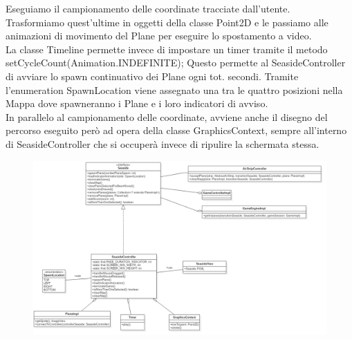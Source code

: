 \documentclass[a4paper,12pt]{report}
\begin{document}
\noindent Eseguiamo il campionamento delle coordinate tracciate dall’utente.
\\
Trasformiamo quest’ultime in oggetti della classe Point2D e le passiamo alle animazioni di movimento del Plane per eseguire lo spostamento a 
video.
\\
La classe Timeline permette invece di impostare un timer tramite il metodo setCycleCount(Animation.INDEFINITE);
Questo permette al SeasideController di avviare lo spawn continuativo dei Plane ogni tot. secondi.
Tramite l’enumeration SpawnLocation viene assegnato una tra le quattro posizioni nella Mappa dove spawneranno i Plane e i loro indicatori di 
avviso.
\\
In parallelo al campionamento delle coordinate, avviene anche il disegno del percorso eseguito però ad opera della classe GraphicsContext,
sempre all’interno di SeasideController che si occuperà invece di ripulire la schermata stessa.
\begin{figure}[H]
    \begin{center}
        \centering
        \includegraphics[width=\textwidth]{img/Design/Rodilosso/SeasideController.png}
    \end{center}
    \label{img:seaside-controller}
\end{figure}
\end{document}
